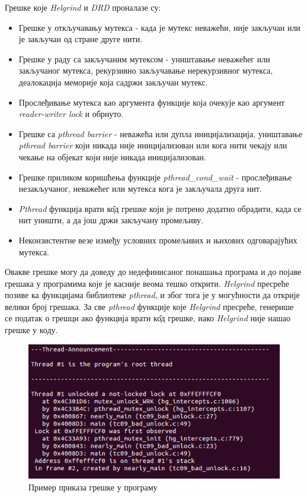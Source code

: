 \documentclass[12pt,oneside]{memoir}
\begin{document}
Грешке које \textit{Helgrind} и \textit{DRD} проналазе су:
\begin{itemize}
	\item Грешке у откључавању мутекса - када је мутекс неважећи, није закључан или је закључан од стране друге нити.
	\item Грешке у раду са закључаним мутексом - уништавање неважећег или закључаног мутекса, рекурзивно закључавање нерекурзивног мутекса, деалокација меморије која садржи закључан мутекс.
	\item Прослеђивање мутекса као аргумента функције која очекује као аргумент  \textit{reader-writer lock} и обрнуто.
	\item Грешке са \textit{pthread barrier} - неважећа или дупла иницијализација,  уништавање \textit{pthread barrier} који никада није иницијализован или кога нити чекају или чекање на објекат који није никада иницијализован.
	\item Грешке приликом коришћења функције \textit{pthread\_cond\_wait} - прослеђивање незакључаног, неважећег или мутекса кога је закључала друга нит.
	\item \textit{Pthread} функција врати к\^{о}д грешке који је потрено додатно обрадити, када се нит уништи, а да још држи закључану промељиву.
	\item Неконзистентне везе између условних промељивих и њихових одговарајућих мутекса. 
\end{itemize}

\indent Овакве грешке могу да доведу до недефинисаног понашања програма и до појаве грешака у програмима које је касније веома тешко открити. \textit{Helgrind} пресреће позиве ка функцијама библиотеке \textit{pthread}, и због тога је у могућности да открије велики број грешака. За све \textit{pthread} функције које \textit{Helgrind} пресреће, генерише се податак о грешци ако функција врати к\^{о}д грешке, иако \textit{Helgrind} није нашао грешке у коду.

\begin{figure}[h!]
\begin{center}
\includegraphics[scale=0.75]{slika13.png}
\end{center}
\caption{Пример приказа грешке у програму}
\label{fig:interfejs}
\end{figure}
\end{document}

